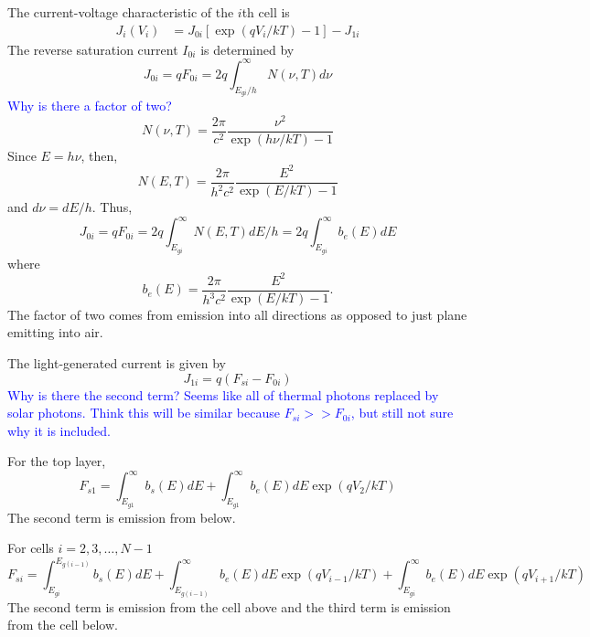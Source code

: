 \documentclass[12pt]{article}
\newcommand{\blue}[1]{\textcolor{blue}{#1}}
\begin{document}
The current-voltage characteristic of the $i$th cell is 
\begin{equation}
\begin{aligned}
J_i(V_i) &= J_{0i} \left [ \exp (q V_i/k T) - 1 \right ] - J_{1i}
\end{aligned}
\end{equation}
The reverse saturation current $I_{0i}$ is determined by 
\begin{equation}
J_{0i} = q F_{0i} = 2 q \int_{E_{gi}/h}^{\infty} N(\nu, T) d \nu
\end{equation}
\blue{Why is there a factor of two?}
\begin{equation}
N( \nu, T) = \frac{ 2 \pi}{c^2} \frac{\nu^2}{\exp (h \nu/ k T) - 1} 
\end{equation}
Since $E = h \nu$, 
then, 
\begin{equation}
N( E, T) = \frac{ 2 \pi}{h^2 c^2} \frac{E^2}{\exp (E/ k T) - 1}
\end{equation}
and $d \nu = d E/h$.  
Thus, 
\begin{equation}
J_{0i} = q F_{0i} = 2 q \int_{E_{gi}}^{\infty} N(E, T) d E/h = 2 q \int_{E_{gi}}^{\infty} b_e(E) d E
\end{equation}
where 
\begin{equation}
b_e(E) = \frac{ 2 \pi}{h^3 c^2} \frac{E^2}{\exp (E/ k T) - 1}.
\end{equation}
The factor of two comes from emission into all directions as opposed to just plane emitting into air.  

The light-generated current is given by 
\begin{equation}
J_{1i} = q ( F_{si} - F_{0i} )
\end{equation}
\blue{Why is there the second term?  Seems like all of thermal photons replaced by solar photons.
Think this will be similar because $F_{si} >> F_{0i}$, but still not sure why it is included.}

For the top layer, 
\begin{equation}
F_{s1} = \int_{E_{g1}}^{\infty} b_s(E) dE + \int_{E_{g1}}^{\infty} b_e(E) dE \exp (q V_2/ k T)
\end{equation}
The second term is emission from below.  

For cells $i = 2, 3, \ldots, N - 1$
\begin{equation}
F_{si} = \int_{E_{gi}}^{E_{g(i-1)}} b_s(E) dE  + \int_{E_{g(i-1)}}^{\infty} b_e(E) dE \exp (q V_{i-1}/ k T) + \int_{E_{gi}}^{\infty} b_e(E) dE \exp (q V_{i+1}/ k T) 
\end{equation}
The second term is emission from the cell above and the third term is emission from the cell below.
\end{document}
